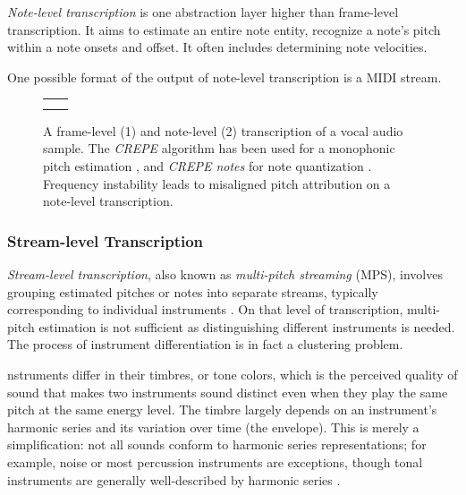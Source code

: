 \emph{Note-level transcription} is one abstraction layer higher than frame-level transcription. It aims to estimate an entire note entity, recognize a note's pitch within a note onsets and offset. It often includes determining note velocities.

One possible format of the output of note-level transcription is a MIDI stream.

\begin{figure}[ht!]
\centering
\begin{tabular}{>{\centering\arraybackslash} m{} >{\centering\arraybackslash} m{}}
1 & \\
2 & 
\end{tabular}
\caption[A frame-level and note-level transcription of a vocal audio sample.]{A frame-level (1) and note-level (2) transcription of a vocal audio sample. The \emph{CREPE} algorithm has been used for a monophonic pitch estimation \cite{Kim2018}, and \emph{CREPE notes} for note quantization \cite{Riley2023}. Frequency instability leads to misaligned pitch attribution on a note-level transcription.}
\end{figure}

\subsubsection{Stream-level Transcription}

\emph{Stream-level transcription}, also known as \emph{multi-pitch streaming} (MPS), involves grouping estimated pitches or notes into separate streams, typically corresponding to individual instruments \cite{Bhattarai2023}. On that level of transcription, multi-pitch estimation is not sufficient as distinguishing different instruments is needed. The process of instrument differentiation is in fact a clustering problem.

nstruments differ in their timbres, or tone colors, which is the perceived quality of sound that makes two instruments sound distinct even when they play the same pitch at the same energy level. The timbre largely depends on an instrument's harmonic series and its variation over time (the envelope). This is merely a simplification: not all sounds conform to harmonic series representations; for example, noise or most percussion instruments are exceptions, though tonal instruments are generally well-described by harmonic series \cite[p.~27--28]{Sethares2005}.

